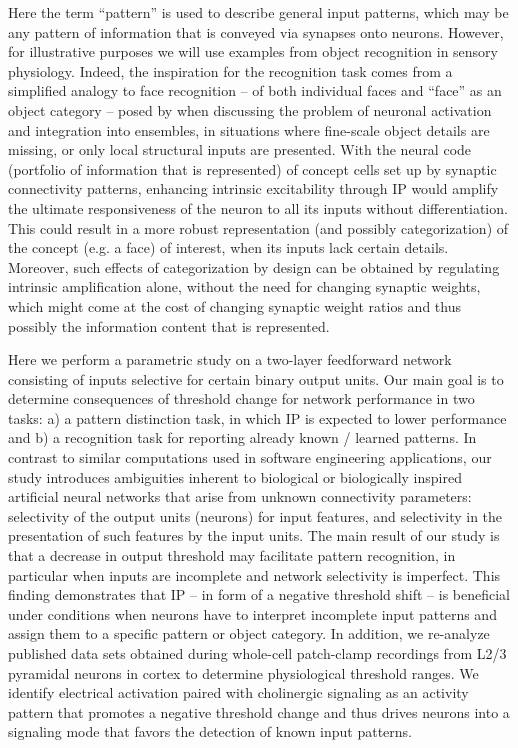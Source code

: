 Here the term ``pattern'' is used to describe general input patterns,
        which may be any pattern of information that is conveyed via synapses onto neurons.
    However, for illustrative purposes we will use examples from object recognition in sensory physiology.
    Indeed, the inspiration for the recognition task comes from a simplified analogy to face recognition
        -- of both individual faces and ``face'' as an object category --
        posed by \cite{Titley2017-da} when discussing the problem of neuronal activation and integration into ensembles,
        in situations where fine-scale object details are missing,
            or only local structural inputs are presented.
    With the neural code (portfolio of information that is represented)
        of concept cells set up by synaptic connectivity patterns,
            enhancing intrinsic excitability through IP would
            amplify the ultimate responsiveness of the neuron to all its inputs without differentiation.
    This could result in a more robust representation
        (and possibly categorization) of the concept (e.g. a face) of interest,
        when its inputs lack certain details.
    Moreover, such effects of categorization by design can be obtained by
        regulating intrinsic amplification alone,
        without the need for changing synaptic weights,
        which might come at the cost of changing synaptic weight ratios
        and thus possibly the information content that is represented.

Here we perform a parametric study on a two-layer feedforward network
        consisting of inputs selective for certain binary output units.
    Our main goal is to determine consequences of threshold change for network performance in two tasks:
        a) a pattern distinction task, in which IP is expected to lower performance
        and b) a recognition task for reporting already known / learned patterns.
    In contrast to similar computations used in software engineering applications,
        our study introduces ambiguities inherent to biological or biologically inspired artificial neural networks
            that arise from unknown connectivity parameters:
                selectivity of the output units (neurons) for input features,
                and selectivity in the presentation of such features by the input units.
    The main result of our study is that a decrease in output threshold may facilitate pattern recognition,
        in particular when inputs are incomplete and network selectivity is imperfect.
    This finding demonstrates that IP -- in form of a negative threshold shift --
        is beneficial under conditions when neurons have to interpret incomplete input patterns and assign them to a specific pattern or object category.
    In addition, we re-analyze published data sets obtained
        during whole-cell patch-clamp recordings from L2/3 pyramidal neurons in cortex
        to determine physiological threshold ranges.
    We identify electrical activation paired with cholinergic signaling
        as an activity pattern that
        promotes a  negative threshold change
        and thus drives neurons into a signaling mode that favors the detection of known input patterns.
